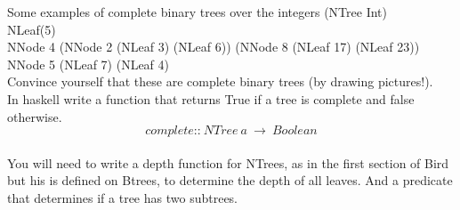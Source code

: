 \documentclass[12pt]{article}
\begin{document}
Some examples of complete binary trees over the integers (NTree Int)\\
\hspace{1in}NLeaf(5) \\
\hspace{1in}NNode 4 (NNode 2 (NLeaf 3) (NLeaf 6)) (NNode 8 (NLeaf 17) (NLeaf 23))  \\
\hspace{1in}NNode 5 (NLeaf 7) (NLeaf 4) \\

Convince yourself that these are complete binary trees (by drawing
pictures!). \\ 

In haskell write a function that returns True if a tree is complete and 
false otherwise.  
\[  complete \text{::} \  NTree\  a\  \rightarrow \  Boolean \] \\

You will need to write a depth function for NTrees, as in
the first section of Bird but his is defined on Btrees, to determine the depth of all leaves.  And a predicate that determines if a tree has two subtrees.
\end{document}
